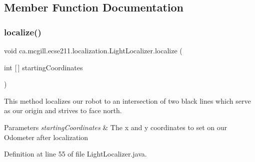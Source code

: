 \subsection{Member Function Documentation}
\mbox{\label{classca_1_1mcgill_1_1ecse211_1_1localization_1_1_light_localizer_afb295ca8cd6623ac3e9eacb1d31b75b9}} 
\subsubsection{\texorpdfstring{localize()}{localize()}}
{\footnotesize\ttfamily void ca.\+mcgill.\+ecse211.\+localization.\+Light\+Localizer.\+localize (\begin{DoxyParamCaption}\item[{int \mbox{[}$\,$\mbox{]}}]{starting\+Coordinates }\end{DoxyParamCaption})}

This method localizes our robot to an intersection of two black lines which serve as our origin and strives to face north.


\begin{DoxyParams}{Parameters}
{\em starting\+Coordinates} & The x and y coordinates to set on our Odometer after localization \\
\hline
\end{DoxyParams}


Definition at line 55 of file Light\+Localizer.\+java.


